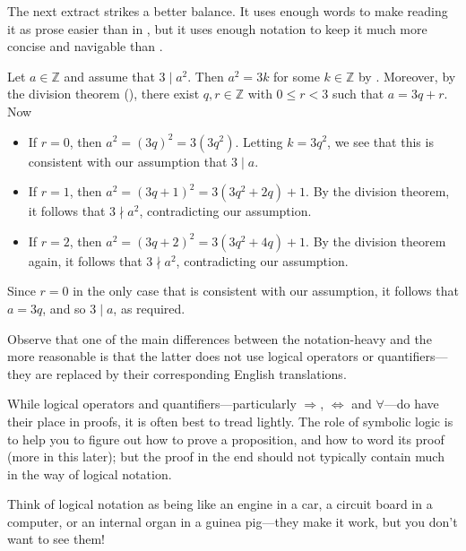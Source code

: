 The next extract strikes a better balance. It uses enough words to make reading it as prose easier than in , but it uses enough notation to keep it much more concise and navigable than .

\begin{extract}
\label{xtrThreeDividesSquareImpliesThreeDividesOriginalJustRightNotation}
Let $a \in \mathbb{Z}$ and assume that $3 \mid a^2$. Then $a^2=3k$ for some $k \in \mathbb{Z}$ by . Moreover, by the division theorem (), there exist $q,r \in \mathbb{Z}$ with $0 \le r < 3$ such that $a=3q+r$. Now

\begin{itemize}
\item If $r=0$, then $a^2=(3q)^2 = 3(3q^2)$. Letting $k=3q^2$, we see that this is consistent with our assumption that $3 \mid a$.
\item If $r=1$, then $a^2 = (3q+1)^2 = 3(3q^2+2q)+1$. By the division theorem, it follows that $3 \nmid a^2$, contradicting our assumption.
\item If $r=2$, then $a^2 = (3q+2)^2 = 3(3q^2+4q)+1$. By the division theorem again, it follows that $3 \nmid a^2$, contradicting our assumption.
\end{itemize}
Since $r=0$ in the only case that is consistent with our assumption, it follows that $a=3q$, and so $3 \mid a$, as required.
\end{extract}

Observe that one of the main differences between the notation-heavy  and the more reasonable  is that the latter does not use logical operators or quantifiers---they are replaced by their corresponding English translations.

While logical operators and quantifiers---particularly $\Rightarrow$, $\Leftrightarrow$ and $\forall$---do have their place in proofs, it is often best to tread lightly. The role of symbolic logic is to help you to figure out how to prove a proposition, and how to word its proof (more in this later); but the proof in the end should not typically contain much in the way of logical notation.

Think of logical notation as being like an engine in a car, a circuit board in a computer, or an internal organ in a guinea pig---they make it work, but you don't want to see them!

